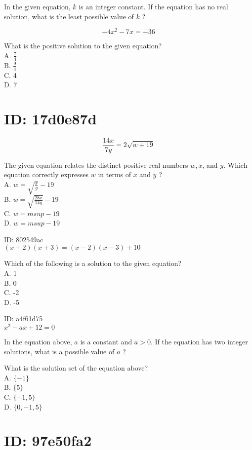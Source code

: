 In the given equation, $k$ is an integer constant. If the equation has no real solution, what is the least possible value of $k$ ?

$$
-4 x^{2}-7 x=-36
$$

What is the positive solution to the given equation?\\
A. $\frac{7}{4}$\\
B. $\frac{9}{4}$\\
C. 4\\
D. 7

\section*{ID: 17d0e87d}
$$
\frac{14 x}{7 y}=2 \sqrt{w+19}
$$

The given equation relates the distinct positive real numbers $w, x$, and $y$. Which equation correctly expresses $w$ in terms of $x$ and $y$ ?\\
A. $w=\sqrt{\frac{x}{y}}-19$\\
B. $w=\sqrt{\frac{28 x}{14 y}}-19$\\
C. $w=m s u p-19$\\
D. $w=m s u p-19$

ID: 802549ac\\
$(x+2)(x+3)=(x-2)(x-3)+10$

Which of the following is a solution to the given equation?\\
A. 1\\
B. 0\\
C. -2\\
D. -5

ID: a4f61d75\\
$x^{2}-a x+12=0$

In the equation above, $a$ is a constant and $a>0$. If the equation has two integer solutions, what is a possible value of $a$ ?

What is the solution set of the equation above?\\
A. $\{-1\}$\\
B. $\{5\}$\\
C. $\{-1,5\}$\\
D. $\{0,-1,5\}$

\section*{ID: 97e50fa2}


